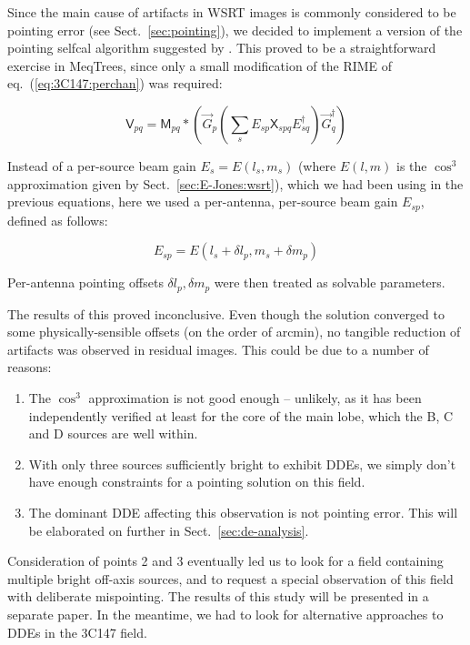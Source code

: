 \documentclass[]{aa}
\newcommand{\jones}[2]{\vec {#1}_{#2}}
\newcommand{\jonesT}[2]{\vec {#1}^\dagger_{#2}}
\newcommand{\coh}[2]{\mathsf{{#1}}_{{#2}}}
\begin{document}
Since the main cause of artifacts in WSRT images is commonly considered to be pointing error (see Sect.~\ref{sec:pointing}), we decided to implement a version of the pointing selfcal algorithm suggested by \citet{SB:pointing}. This proved to be a straightforward exercise in MeqTrees, since only a small modification of the RIME of eq.~(\ref{eq:3C147:perchan}) was required: 

\begin{equation}\label{eq:3C147:pointing}
\coh{V}{pq} = \coh{M}{pq} \ast \left ( \jones{G}{p} \left( \sum_s E_{sp} \coh{X}{spq} E^{\dagger}_{sq} \right) \jonesT{G}{q} \right )
\end{equation}

Instead of a per-source beam gain $E_s=E(l_s,m_s)$ (where $E(l,m)$ is the $\cos^3$ approximation given by Sect.~\ref{sec:E-Jones:wsrt}), which we had been using in the previous equations, here we used a per-antenna, per-source beam gain $E_{sp}$, defined as follows:

\begin{equation}\label{eq:3C147:offset-beam}
E_{sp} = E(l_s+\delta l_p,m_s+\delta m_p)
\end{equation}

Per-antenna pointing offsets $\delta l_p,\delta m_p$ were then treated as solvable parameters. 

The results of this proved inconclusive. Even though the solution converged to some physically-sensible offsets (on the order of arcmin), no tangible reduction of artifacts was observed in residual images. This could be due to a number of reasons:

\begin{enumerate}
\item The $\cos^3$ approximation is not good enough -- unlikely, as it has been independently verified at least for the core of the main lobe, which the B, C and D sources are well within.
\item With only three sources sufficiently bright to exhibit DDEs, we simply don't have enough constraints for a pointing solution on this field.
\item The dominant DDE affecting this observation is not pointing error. This will be elaborated on further in Sect.~\ref{sec:de-analysis}. 
\end{enumerate}

Consideration of points 2 and 3 eventually led us to look for a field containing multiple bright off-axis sources, and to request a special observation of this field with deliberate mispointing. The results of this study will be presented in a separate paper. In the meantime, we had to look for alternative approaches to DDEs in the 3C147 field.
\end{document}
